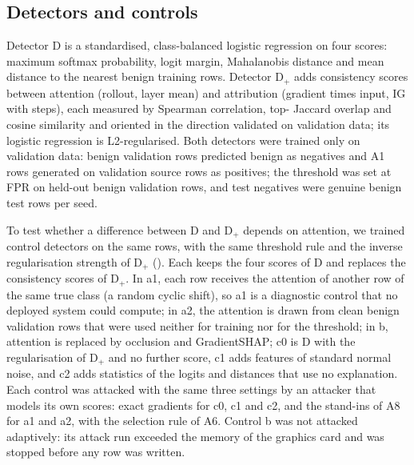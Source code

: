 \subsection*{Detectors and controls}
\label{sec:detectors}
Detector D is a standardised, class-balanced logistic regression on four scores: maximum softmax probability, logit
margin, Mahalanobis distance and mean distance to the \paramKnn{} nearest benign training rows.
Detector D$_+$ adds \nConsistency{} consistency scores between attention (rollout, layer mean) and attribution (gradient
times input, IG with \paramIGDet{} steps), each measured by Spearman correlation, top-\paramTopK{} Jaccard overlap and
cosine similarity and oriented in the direction validated on validation data; its logistic regression is
L2-regularised.
Both detectors were trained only on validation data: \paramNegTrain{} benign validation rows predicted benign as
negatives and A1 rows generated on validation source rows as positives; the threshold was set at \paramFPR{} FPR on
\paramNegHeld{} held-out benign validation rows, and test negatives were \paramNegTest{} genuine benign test rows per
seed.

To test whether a difference between D and D$_+$ depends on attention, we trained \nControlsAll{} control detectors on
the same rows, with the same threshold rule and the inverse regularisation strength of D$_+$ (\apCplus).
Each keeps the four scores of D and replaces the \nConsistency{} consistency scores of D$_+$.
In a1, each row receives the attention of another row of the same true class (a random cyclic shift), so a1 is a
diagnostic control that no deployed system could compute; in a2, the attention is drawn from clean benign validation
rows that were used neither for training nor for the threshold; in b, attention is replaced by occlusion and
GradientSHAP; c0 is D with the regularisation of D$_+$ and no further score, c1 adds \nConsistency{} features of
standard normal noise, and c2 adds \nConsistency{} statistics of the logits and distances that use no explanation.
Each control was attacked with the same three settings by an attacker that models its own scores: exact gradients for
c0, c1 and c2, and the stand-ins of A8 for a1 and a2, with the selection rule of A6.
Control b was not attacked adaptively: its attack run exceeded the memory of the graphics card and was stopped before
any row was written.

